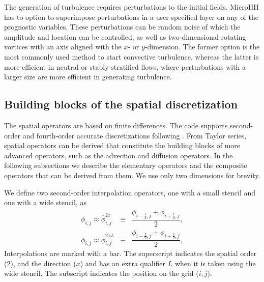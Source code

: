 \documentclass[gmd,manuscript]{copernicus}
\begin{document}
The generation of turbulence requires perturbations to the initial fields. MicroHH has to option to superimpose perturbations in a user-specified layer on any of the prognostic variables. These perturbations can be random noise of which the amplitude and location can be controlled, as well as two-dimensional rotating vortices with an axis aligned with the $x$- or $y$-dimension. The former option is the most commonly used method to start convective turbulence, whereas the latter is more efficient in neutral or stably-stratified flows, where perturbations with a larger size are more efficient in generating turbulence.

\subsection{Building blocks of the spatial discretization}\label{sec:buiding_blocks}
The spatial operators are based on finite differences. The code supports second-order and fourth-order accurate discretizations following \citet{Morinishi1998, Vasilyev2000}. From Taylor series, spatial operators can be derived that constitute the building blocks of more advanced operators, such as the advection and diffusion operators. In the following subsections we describe the elementary operators and the composite operators that can be derived from them. We use only two dimensions for brevity.

We define two second-order interpolation operators, one with a small stencil and one with a wide stencil, as
\begin{eqnarray}
\phi_{i,j} \approx \overline{\phi}^{2x }_{i,j} & \equiv & \dfrac{\phi_{i-\frac{1}{2},j} + \phi_{i+\frac{1}{2},j}}{2},\\
\phi_{i,j} \approx \overline{\phi}^{2xL}_{i,j} & \equiv & \dfrac{\phi_{i-\frac{3}{2},j} + \phi_{i+\frac{3}{2},j}}{2},
\end{eqnarray}
Interpolations are marked with a bar. The superscript indicates the spatial order (2), and the direction ($x$) and has an extra qualifier $L$ when it is taken using the wide stencil. The subscript indicates the position on the grid ($i,j$).
\end{document}
